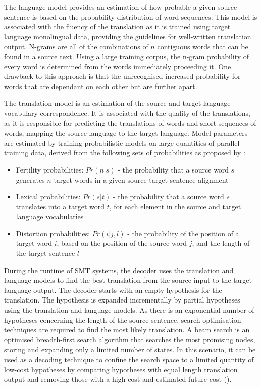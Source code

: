 The language model provides an estimation of how probable a given source sentence is based on the probability distribution of word sequences. This model is associated with the fluency of the translation as it is trained using target language monolingual data, providing the guidelines for well-written translation output. N-grams are all of the combinations of $n$ contiguous words that can be found in a source text. Using a large training corpus, the n-gram probability of every word is determined from the words immediately proceeding it. One drawback to this approach is that the unrecognised increased probability for words that are dependant on each other but are further apart.

The translation model is an estimation of the source and target language vocabulary correspondence. It is associated with the quality of the translations, as it is responsible for predicting the translations of words and short sequences of words, mapping the source language to the target language. Model parameters are estimated by training probabilistic models on large quantities of parallel training data, derived from the following sets of probabilities as proposed by \cite{brown_statistical_1990}:
\begin{itemize}
    \item Fertility probabilities:  $Pr(n|s)$ - the probability that a source word $s$ generates $n$ target words in a given source-target sentence alignment
    
    \item Lexical probabilities: $Pr(s|t)$ - the probability that a source word $s$ translates into a target word $t$, for each element in the source and target language vocabularies
    
    \item Distortion probabilities: $Pr(i|j, l)$ - the probability of the position of a target word $i$, based on the position of the source word $j$, and the length of the target sentence $l$
\end{itemize}

During the runtime of \acrshort{SMT} systems, the decoder uses the translation and language models to find the best translation from the source input to the target language output. 
The decoder starts with an empty hypothesis for the translation. The hypothesis is expanded incrementally by partial hypotheses using the translation and language models. As there is an exponential number of hypotheses concerning the length of the source sentence, search optimisation techniques are required to find the most likely translation. A beam search is an optimised breadth-first search algorithm that searches the most promising nodes, storing and expanding only a limited number of states. In this scenario, it can be used as a decoding technique to confine the search space to a limited quantity of low-cost hypotheses by comparing hypotheses with equal length translation output and removing those with a high cost and estimated future cost (\cite{koehn_pharaoh_2004}).

